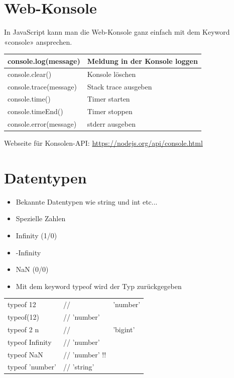 \documentclass[10pt]{article}
\begin{document}
\section*{Web-Konsole}
In JavaScript kann man die Web-Konsole ganz einfach mit dem Keyword «console» ansprechen.

\begin{center}
\begin{tabular}{|l|l|}
\hline
console.log(message) & Meldung in der Konsole loggen \\
\hline
console.clear() & Konsole löschen \\
\hline
console.trace(message) & Stack trace ausgeben \\
\hline
console.time() & Timer starten \\
\hline
console.timeEnd() & Timer stoppen \\
\hline
console.error(message) & stderr ausgeben \\
\hline
\end{tabular}
\end{center}

Webseite für Konsolen-API: \href{https://nodejs.org/api/console.html}{https://nodejs.org/api/console.html}

\section*{Datentypen}
\begin{itemize}
  \item Bekannte Datentypen wie string und int etc...
  \item Spezielle Zahlen
  \item Infinity (1/0)
  \item -Infinity
  \item NaN (0/0)
  \item Mit dem keyword typeof wird der Typ zurückgegeben
\end{itemize}

\begin{center}
\begin{tabular}{lll}
\hline
typeof 12 & // & 'number' \\
typeof(12) & // 'number' &  \\
typeof 2 n & // & 'bigint' \\
typeof Infinity & // 'number' &  \\
typeof NaN & // 'number' !! &  \\
typeof 'number' & // 'string' &  \\
\hline
\end{tabular}
\end{center}
\end{document}
